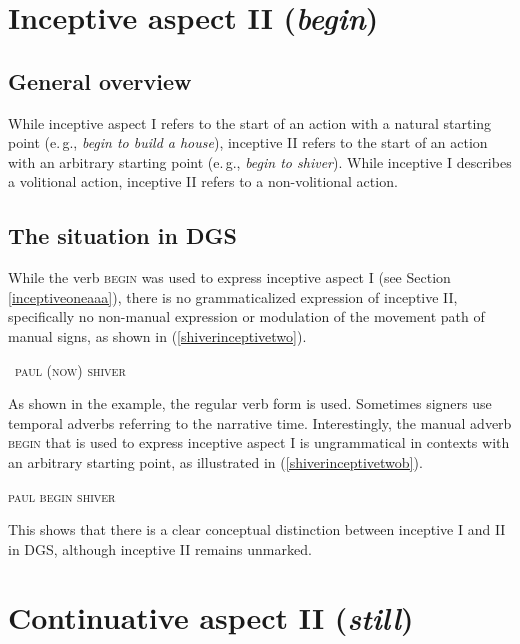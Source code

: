 

\section{Inceptive aspect II (\textit{begin})}\label{inceptivetwo}
\subsection{General overview}

While inceptive aspect I refers to the start of an action with a natural starting point (e.\,g., \textit{begin to build a house}), inceptive II refers to the start of an action with an arbitrary starting point (e.\,g., \textit{begin to shiver}). While inceptive I describes a volitional action, inceptive II refers to a non-volitional action.

\subsection{The situation in DGS}
While the verb \textsc{begin} was used to express inceptive aspect I (see Section \ref{inceptiveoneaaa}), there is no grammaticalized expression of inceptive II, specifically no non-manual expression or modulation of the movement path of manual signs, as shown in (\ref{shiverinceptivetwo}). 

\begin{exe}
\ex \textcolor{white}{*}\textsc{paul (now) shiver} \label{shiverinceptivetwo}
\end{exe}

\noindent As shown in the example, the regular verb form is used. Sometimes signers use temporal adverbs referring to the narrative time. Interestingly, the manual adverb \textsc{begin} that is used to express inceptive aspect I is ungrammatical in contexts with an arbitrary starting point, as illustrated in (\ref{shiverinceptivetwob}). 

\begin{exe}
\ex *\textsc{paul begin shiver} \label{shiverinceptivetwob}
\end{exe}

\noindent This shows that there is a clear conceptual distinction between inceptive I and II in DGS, although inceptive II remains unmarked. 




\section{Continuative aspect II (\textit{still})}\label{continuativetwo}
